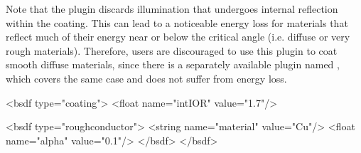 Note that the plugin discards illumination that undergoes internal
reflection within the coating. This can lead to a noticeable energy
loss for materials that reflect much of their energy near or below the critical
angle (i.e. diffuse or very rough materials).
Therefore, users are discouraged to use this plugin to coat smooth
diffuse materials, since there is a separately available plugin
named , which covers the same case and does not
suffer from energy loss.\newpage


\vspace{4mm}

\begin{xml}[caption=Rough copper coated with a transparent layer of
    varnish, label=lst:coating-roughcopper]
<bsdf type="coating">
    <float name="intIOR" value="1.7"/>

    <bsdf type="roughconductor">
        <string name="material" value="Cu"/>
        <float name="alpha" value="0.1"/>
    </bsdf>
</bsdf>
\end{xml}


